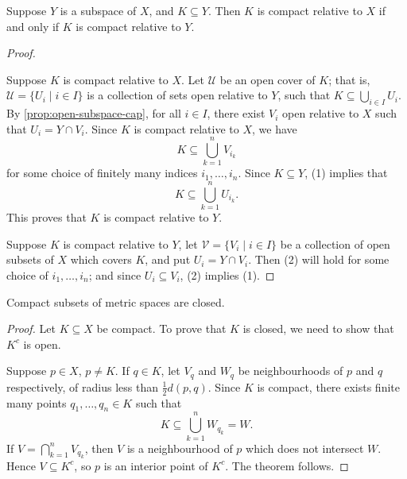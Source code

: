 \begin{proposition}
Suppose $Y$ is a subspace of $X$, and $K\subseteq Y$. Then $K$ is compact relative to $X$ if and only if $K$ is compact relative to $Y$.
\end{proposition}

\begin{proof} \

\fbox{$\implies$} Suppose $K$ is compact relative to $X$. Let $\mathcal{U}$ be an open cover of $K$; that is, $\mathcal{U}=\{U_i\mid i\in I\}$ is a collection of sets open relative to $Y$, such that $K\subseteq\bigcup_{i\in I}U_i$. 
By \cref{prop:open-subspace-cap}, for all $i\in I$, there exist $V_i$ open relative to $X$ such that $U_i=Y\cap V_i$. Since $K$ is compact relative to $X$, we have
\begin{equation*}\tag{1}
K\subseteq\bigcup_{k=1}^{n}V_{i_k}
\end{equation*}
for some choice of finitely many indices $i_1,\dots,i_n$. Since $K\subseteq Y$, (1) implies that
\begin{equation*}\tag{2}
K\subseteq\bigcup_{k=1}^{n}U_{i_k}.
\end{equation*}
This proves that $K$ is compact relative to $Y$.

\fbox{$\impliedby$} Suppose $K$ is compact relative to $Y$, let $\mathcal{V}=\{V_i\mid i\in I\}$ be a collection of open subsets of $X$ which covers $K$, and put $U_i=Y\cap V_i$. Then (2) will hold for some choice of $i_1,\dots,i_n$; and since $U_i\subseteq V_i$, (2) implies (1).
\end{proof}

\begin{proposition}
Compact subsets of metric spaces are closed.
\end{proposition}

\begin{proof}
Let $K\subseteq X$ be compact. To prove that $K$ is closed, we need to show that $K^c$ is open.

Suppose $p\in X$, $p\neq K$. If $q\in K$, let $V_q$ and $W_q$ be neighbourhoods of $p$ and $q$ respectively, of radius less than $\frac{1}{2}d(p,q)$. Since $K$ is compact, there exists finite many points $q_1,\dots,q_n\in K$ such that
\[K\subseteq\bigcup_{k=1}^{n}W_{q_k}=W.\]
If $V=\bigcap_{k=1}^{n}V_{q_k}$, then $V$ is a neighbourhood of $p$ which does not intersect $W$. Hence $V\subseteq K^c$, so $p$ is an interior point of $K^c$. The theorem follows.
\end{proof}

